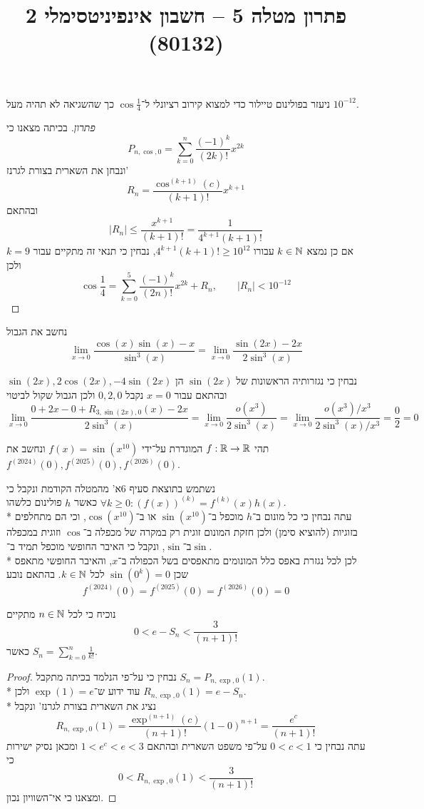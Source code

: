 
\usepackage{tikz}
\DeclareMathOperator\arcsinh{arcsinh}
\title{פתרון מטלה 5 – חשבון אינפיניטסימלי 2 (80132)}


\maketitle
\maketitleprint{}

\Question{}
ניעזר בפולינום טיילור כדי למצוא קירוב רציונלי ל־$\cos \frac{1}{4}$ כך שהשגיאה לא תהיה מעל $10^{-12}$.
\begin{proof}[פתרון]
	בכיתה מצאנו כי
	\[
		P_{n, \cos, 0} = \sum_{k = 0}^{n} \frac{{(-1)}^k}{(2k)!} x^{2k}
	\]
	ונבחן את השארית בצורת לגרנז'
	\[
		R_n = \frac{\cos^{(k + 1)}(c)}{(k + 1)!}x^{k + 1}
	\]
	ובהתאם
	\[
		|R_n| \le \frac{x^{k + 1}}{(k + 1)!} = \frac{1}{4^{k + 1}(k + 1)!}
	\]
	אם כן נמצא $k \in \mathbb{N}$ עבורו $4^{k + 1} (k + 1)! \ge 10^{12}$, נבחין כי תנאי זה מתקיים עבור $k = 9$ ולכן
	\[
		\cos \frac{1}{4} = \sum_{k = 0}^{5} \frac{{(-1)}^k}{(2n)!} x^{2k} + R_n,
		\qquad |R_n| < 10^{-12}
	\]
\end{proof}

\Question{}
נחשב את הגבול
\[
	\lim_{x \to 0} \frac{\cos(x) \sin(x) - x}{\sin^3(x)}
	= \lim_{x \to 0} \frac{\sin(2x) - 2x}{2\sin^3(x)}
\]

נבחין כי נגזרותיה הראשונות של $\sin(2x)$ הן $\sin(2x), 2\cos(2x), -4\sin(2x)$ ובהתאם עבור $x = 0$ נקבל $0, 2, 0$
ולכן הגבול שקול לביטוי
\[
	\lim_{x \to 0} \frac{0 + 2x - 0 + R_{3,\sin(2x), 0}(x) - 2x}{2 \sin^3(x)}
	= \lim_{x \to 0} \frac{o(x^3)}{2 \sin^3(x)}
	= \lim_{x \to 0} \frac{o(x^3)/x^3}{2 \sin^3(x)/x^3}
	= \frac{0}{2} = 0
\]

\Question{}
תהי $f : \mathbb{R} \to \mathbb{R}$ המוגדרת על־ידי $f(x) = \sin(x^{10})$ ונחשב את $f^{(2024)}(0),f^{(2025)}(0),f^{(2026)}(0)$.

נשתמש בתוצאת סעיף 6א' מהמטלה הקודמת ונקבל כי $\forall k \ge 0 : {(f(x))}^{(k)} = f^{(k)}(x) h(x)$ כאשר $h$ פולינום כלשהו. \\*
עתה נבחין כי כל מונום ב־$h$ מוכפל ב־$\sin(x^{10})$ או ב־$\cos(x^{10})$, וכי הם מתחלפים בזוגיות (להוציא סימן) ולכן חזקת המונום זוגית רק במקרה של מכפלה ב־$\cos$ וזוגית במכפלה ב־$\sin$, ונקבל כי האיבר החופשי מוכפל תמיד ב־$\sin$. \\*
לכן לכל נגזרת באפס כלל המונומים מתאפסים בשל הכפולה ב־$x$, והאיבר החופשי מתאפס שכן $\sin(0^k) = 0$ לכל $k \in \mathbb{N}$.
בהתאם נובע
\[
	f^{(2024)}(0) = f^{(2025)}(0) = f^{(2026)}(0) = 0
\]

\Question{}
\Subquestion{}
נוכיח כי לכל $n \in \mathbb{N}$ מתקיים
\[
	0 < e - S_n < \frac{3}{(n + 1)!}
\]
כאשר $S_n = \sum_{k = 0}^{n} \frac{1}{k!}$.
\begin{proof}
	נבחין כי על־פי הנלמד בכיתה מתקבל $S_n = P_{n, \exp, 0}(1)$. \\*
	עוד ידוע ש־$\exp(1) = e$ ולכן $R_{n, \exp, 0}(1) = e - S_n$. \\*
	נציג את השארית בצורת לגרנז' ונקבל
	\[
		R_{n, \exp, 0}(1) = \frac{\exp^{(n + 1)}(c)}{(n + 1)!}{(1 - 0)}^{n + 1}
		= \frac{e^c}{(n + 1)!}
	\]
	עתה נבחין כי $0 < c < 1$ על־פי משפט השארית ובהתאם $1 < e^c < e < 3$ ומכאן נסיק ישירות כי
	\[
		0 < R_{n, \exp, 0}(1) < \frac{3}{(n + 1)!}
	\]
	ומצאנו כי אי־השוויון נכון.
\end{proof}

